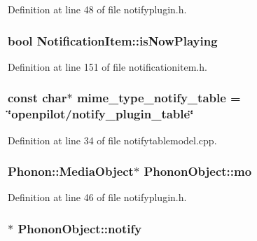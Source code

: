 Definition at line 48 of file notifyplugin.\-h.

\hypertarget{group__notifyplugin_gabd9ee81e318805b60e89e7045eb7deaa}{
\subsubsection[{is\-Now\-Playing}]{\setlength{\rightskip}{0pt plus 5cm}bool Notification\-Item\-::is\-Now\-Playing}}\label{group__notifyplugin_gabd9ee81e318805b60e89e7045eb7deaa}


Definition at line 151 of file notificationitem.\-h.

\hypertarget{group__notifyplugin_ga326ccffe8d16a6f14d44c2048dea58a7}{
\subsubsection[{mime\-\_\-type\-\_\-notify\-\_\-table}]{\setlength{\rightskip}{0pt plus 5cm}const char$\ast$ mime\-\_\-type\-\_\-notify\-\_\-table = \char`\"{}openpilot/notify\-\_\-plugin\-\_\-table\char`\"{}}}\label{group__notifyplugin_ga326ccffe8d16a6f14d44c2048dea58a7}


Definition at line 34 of file notifytablemodel.\-cpp.

\hypertarget{group__notifyplugin_ga3b35d975a7599cd263b275559734e54d}{
\subsubsection[{mo}]{\setlength{\rightskip}{0pt plus 5cm}Phonon\-::\-Media\-Object$\ast$ Phonon\-Object\-::mo}}\label{group__notifyplugin_ga3b35d975a7599cd263b275559734e54d}


Definition at line 46 of file notifyplugin.\-h.

\hypertarget{group__notifyplugin_ga82a15e7062562dabd14047b2e5398889}{
\subsubsection[{notify}]{$\ast$ Phonon\-Object\-::notify}}\label{group__notifyplugin_ga82a15e7062562dabd14047b2e5398889}



